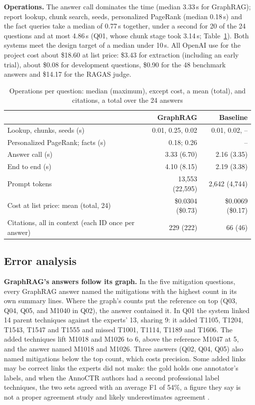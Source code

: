 \documentclass[conference,letterpaper]{IEEEtran}
\begin{document}
\textbf{Operations.} The answer call dominates the time (median 3.33\,s for GraphRAG); report lookup, chunk search, seeds, personalized PageRank (median 0.18\,s) and the fact queries take a median of 0.77\,s together, under a second for 20 of the 24 questions and at most 4.86\,s (Q01, whose chunk stage took 3.14\,s; Table~\ref{tab:ops}). Both systems meet the design target of a median under 10\,s. All OpenAI use for the project cost about \$18.60 at list price: \$3.43 for extraction (including an early trial), about \$0.08 for development questions, \$0.90 for the 48 benchmark answers and \$14.17 for the RAGAS judge.

\begin{table}[t]\centering\footnotesize
\caption{Operations per question: median (maximum), except cost, a mean (total), and citations, a total over the 24 answers}\label{tab:ops}
\setlength{\tabcolsep}{3pt}
\begin{tabularx}{\linewidth}{@{}>{\raggedright\arraybackslash}X r r@{}}
\toprule
 & GraphRAG & Baseline\\
\midrule
Lookup, chunks, seeds (s) & 0.01, 0.25, 0.02 & 0.01, 0.02, --\\
Personalized PageRank; facts (s) & 0.18; 0.26 & --\\
Answer call (s) & 3.33 (6.70) & 2.16 (3.35)\\
End to end (s) & 4.10 (8.15) & 2.19 (3.38)\\
Prompt tokens & 13,553 (22,595) & 2,642 (4,744)\\
Cost at list price: mean (total, 24) & \$0.0304 (\$0.73) & \$0.0069 (\$0.17)\\
Citations, all in context (each ID once per answer) & 229 (222) & 66 (46)\\
\bottomrule
\end{tabularx}
\end{table}

\subsection{Error analysis}
\textbf{GraphRAG's answers follow its graph.} In the five mitigation questions, every GraphRAG answer named the mitigations with the highest count in its own summary lines. Where the graph's counts put the reference on top (Q03, Q04, Q05, and M1040 in Q02), the answer contained it. In Q01 the system linked 14 parent techniques against the experts' 13, sharing 9: it added T1105, T1204, T1543, T1547 and T1555 and missed T1001, T1114, T1189 and T1606. The added techniques lift M1018 and M1026 to 6, above the reference M1047 at 5, and the answer named M1018 and M1026. Three answers (Q02, Q04, Q05) also named mitigations below the top count, which costs precision. Some added links may be correct links the experts did not make: the gold holds one annotator's labels, and when the AnnoCTR authors had a second professional label techniques, the two sets agreed with an average F1 of 54\%, a figure they say is not a proper agreement study and likely underestimates agreement \cite{lange2024}.
\end{document}
